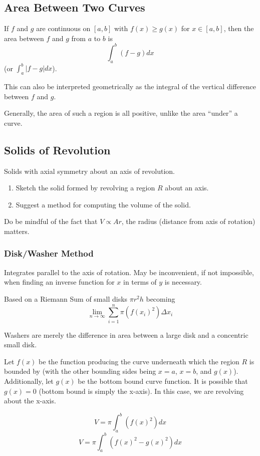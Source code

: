 \documentclass{article}
\begin{document}
\subsection{Area Between Two Curves}
If $f$ and $g$ are continuous on $[a,b]$ with $f(x) \ge g(x)$ for $x \in [a,b]$, then the area between $f$ and $g$ from $a$ to $b$ is $$\int_{a}^{b} (f-g)dx$$ (or $\int_{a}^{b} |f-g| dx$).

This can also be interpreted geometrically as the integral of the vertical difference between $f$ and $g$.

Generally, the area of such a region is all positive, unlike the area ``under'' a curve.

\subsection{Solids of Revolution}
Solids with axial symmetry about an axis of revolution.

\begin{enumerate}
    \item Sketch the solid formed by revolving a region $R$ about an axis.
    \item Suggest a method for computing the volume of the solid.
\end{enumerate}

Do be mindful of the fact that $V \propto Ar$, the radius (distance from axis of rotation) matters.

\subsubsection{Disk/Washer Method}
Integrates parallel to the axis of rotation. May be inconvenient, if not impossible, when finding an inverse function for $x$ in terms of $y$ is necessary.

Based on a Riemann Sum of small disks $\pi r^2h$ becoming $$\lim_{n \to \infty} \sum_{i=1}^{n} \pi(f(x_i)^2)\Delta x_i$$

Washers are merely the difference in area between a large disk and a concentric small disk.

Let $f(x)$ be the function producing the curve underneath which the region $R$ is bounded by (with the other bounding sides being $x = a$, $x = b$, and $g(x)$). Additionally, let $g(x)$ be the bottom bound curve function. It is possible that $g(x) = 0$ (bottom bound is simply the x-axis). In this case, we are revolving about the x-axis.

$$V = \pi \int_{a}^{b} (f(x)^2) dx$$
$$V = \pi \int_{a}^{b} (f(x)^2 - g(x)^2) dx$$
\end{document}
